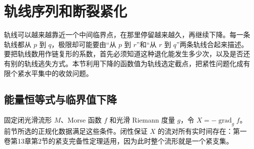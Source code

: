 
% 
% 

\section{轨线序列和断裂紧化}
\label{g2:sec:1802}

轨线可以越来越靠近一个中间临界点，在那里停留越来越久，再继续下降。每一条轨线都从 \(p\) 到 \(q\)，极限却可能要由“从 \(p\) 到 \(r\)”和“从 \(r\) 到 \(q\)”两条轨线合起来描述。要把轨线数用作链复形的系数，首先必须知道这种退化能发生多少次，以及是否还有别的轨线逃失方式。本节利用下降的函数值为轨线选定截点，把紧性问题化成有限个紧水平集中的收敛问题。

\subsection{能量恒等式与临界值下降}
\label{g2:subsec:1802:01}

固定闭光滑流形 \(M\)、Morse 函数 \(f\) 和光滑 Riemann 度量 \(g\)，令 \(X=-\operatorname{grad}_g f\)。前节所选的正规化数据满足这些条件。闭性保证 \(X\) 的流对所有实时间存在：第一卷第13章第2节的紧支完备性定理适用，因为此时整个流形就是一个紧支集。

